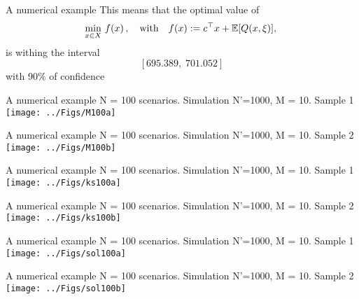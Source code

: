 \begin{frame}{A numerical example}
This means that the optimal value of
\[
 \min_{x \in  X}\,f(x)\,,\quad\mbox{with}\quad f(x):=c^\top  x + \mathbb{E}[Q(x, \xi)],\; 
\]
is withing the interval
\[
[695.389, \; 701.052]
\]
with 90\% of confidence
\end{frame}

\begin{frame}{A numerical example}
{N = 100 scenarios. Simulation N'=1000, M = 10. Sample 1}
\centering \texttt{[image: ../Figs/M100a]} 
\end{frame}

\begin{frame}{A numerical example}
{N = 100 scenarios. Simulation N'=1000, M = 10. Sample 2}
\centering \texttt{[image: ../Figs/M100b]} 
\end{frame}



\begin{frame}{A numerical example}
{N = 100 scenarios. Simulation N'=1000, M = 10. Sample 1}
\centering \texttt{[image: ../Figs/ks100a]} 
\end{frame}

\begin{frame}{A numerical example}
{N = 100 scenarios. Simulation N'=1000, M = 10. Sample 2}
\centering \texttt{[image: ../Figs/ks100b]} 
\end{frame}

\begin{frame}{A numerical example}
{N = 100 scenarios. Simulation N'=1000, M = 10. Sample 1}
\centering \texttt{[image: ../Figs/sol100a]} 
\end{frame}

\begin{frame}{A numerical example}
{N = 100 scenarios. Simulation N'=1000, M = 10. Sample 2}
\centering \texttt{[image: ../Figs/sol100b]} 
\end{frame}